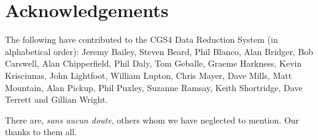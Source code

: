 {\section{Acknowledgements}
\label{acknowledgements}

The following have contributed to the CGS4 Data Reduction System 
(in alphabetical order): Jeremy Bailey, Steven Beard, Phil Blanco, Alan 
Bridger, Bob Carswell, Alan Chipperfield, Phil Daly, Tom Geballe, 
Graeme Harkness, Kevin Krisciunas, John Lightfoot, William Lupton, Chris Mayer, 
Dave Mills, Matt Mountain, Alan Pickup, Phil Puxley, Suzanne Ramsay, 
Keith Shortridge, Dave Terrett and Gillian Wright.

There are, {\em sans aucun doute}, others whom we have neglected to mention. 
Our thanks to them all.

\newpage
\markright{\stardocname}
}
